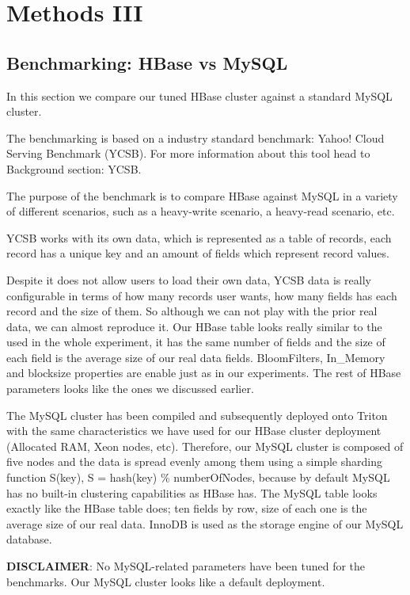 \chapter{Methods III}
\label{chapter:methods III}
 
\section{Benchmarking: HBase vs MySQL}

In this section we compare our tuned HBase cluster against a standard MySQL cluster.

\bigskip

The benchmarking is based on a industry standard benchmark: Yahoo! Cloud Serving Benchmark (YCSB). For more information about this tool head to Background section: YCSB.
\par
The purpose of the benchmark is to compare HBase against MySQL in a variety of different scenarios, such as a heavy-write scenario, a heavy-read scenario, etc.
\par
YCSB works with its own data, which is represented as a table of records, each record has a unique key and an amount of fields which represent record values.
\par
Despite it does not allow users to load their own data, YCSB data is really configurable in terms of how many records user wants, how many fields has each record and the size of them. So although we can not play with the prior real data, we can almost reproduce it. Our HBase table looks really similar to the used in the whole experiment, it has the same number of fields and the size of each field is the average size of our real data fields. BloomFilters, In\_Memory and blocksize properties are enable just as in our experiments. The rest of HBase parameters looks like the ones we discussed earlier.
\par
The MySQL cluster has been compiled and subsequently deployed onto Triton with the same characteristics we have used for our HBase cluster deployment (Allocated RAM, Xeon nodes, etc). Therefore, our MySQL cluster is composed of five nodes and the data is spread evenly among them using a simple sharding function S(key), S = hash(key) \% numberOfNodes, because by default MySQL has no built-in clustering capabilities as HBase has. The MySQL table looks exactly like the HBase table does; ten fields by row, size of each one is the average size of our real data. InnoDB is used as the storage engine of our MySQL database. 
\par
\textbf{DISCLAIMER}: No MySQL-related parameters have been tuned for the benchmarks. Our MySQL cluster looks like a default deployment.

